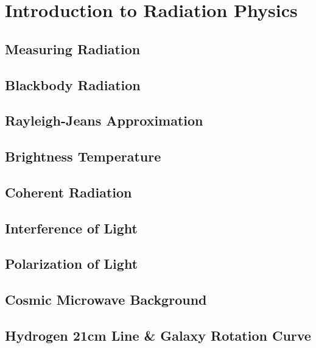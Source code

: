 \chapter{Introduction to Radiation Physics}

\section{Measuring Radiation}

\clearpage

\section{Blackbody Radiation}

\clearpage

\section{Rayleigh-Jeans Approximation}

\clearpage

\section{Brightness Temperature}

\clearpage

\section{Coherent Radiation}

\clearpage

\section{Interference of Light}

\clearpage

\section{Polarization of Light}

\clearpage

\section{Cosmic Microwave Background}

\clearpage

\section{Hydrogen 21cm Line \& Galaxy Rotation Curve}